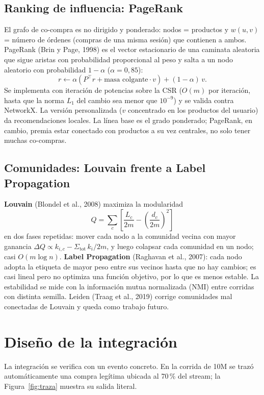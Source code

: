 \documentclass[11pt,letterpaper]{article}
\begin{document}
\subsection{Ranking de influencia: PageRank}

El grafo de co-compra es no dirigido y ponderado: nodos = productos y $w(u,v)$ = número de órdenes (compras de una misma sesión) que contienen a ambos. PageRank (Brin y Page, 1998) es el vector estacionario de una caminata aleatoria que sigue aristas con probabilidad proporcional al peso y salta a un nodo aleatorio con probabilidad $1-\alpha$ ($\alpha = 0{,}85$):
\[ r \leftarrow \alpha\left(P^{\top} r + \text{masa colgante}\cdot v\right) + (1-\alpha)\,v. \]
Se implementa con iteración de potencias sobre la CSR ($O(m)$ por iteración, hasta que la norma $L_1$ del cambio sea menor que $10^{-9}$) y se valida contra NetworkX. La versión personalizada ($v$ concentrado en los productos del usuario) da recomendaciones locales. La línea base es el grado ponderado; PageRank, en cambio, premia estar conectado con productos a su vez centrales, no solo tener muchas co-compras.

\subsection{Comunidades: Louvain frente a Label Propagation}

\textbf{Louvain} (Blondel et al., 2008) maximiza la modularidad
\[ Q = \sum_{c}\left[\frac{L_c}{2m} - \left(\frac{d_c}{2m}\right)^{2}\right] \]
en dos fases repetidas: mover cada nodo a la comunidad vecina con mayor ganancia $\Delta Q \propto k_{i,c} - \Sigma_\text{tot}\,k_i/2m$, y luego colapsar cada comunidad en un nodo; casi $O(m \log n)$. \textbf{Label Propagation} (Raghavan et al., 2007): cada nodo adopta la etiqueta de mayor peso entre sus vecinos hasta que no hay cambios; es casi lineal pero no optimiza una función objetivo, por lo que es menos estable. La estabilidad se mide con la información mutua normalizada (NMI) entre corridas con distinta semilla. Leiden (Traag et al., 2019) corrige comunidades mal conectadas de Louvain y queda como trabajo futuro.

\section{Diseño de la integración}\label{sec:integracion}

La integración se verifica con un evento concreto. En la corrida de 10M se trazó automáticamente una compra legítima ubicada al 70\,\% del stream; la Figura~\ref{fig:traza} muestra su salida literal.
\end{document}
